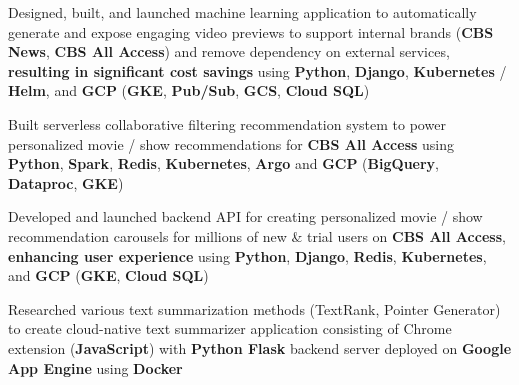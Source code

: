 \begin{cventries}
{\begin{cvitems}
            \item {Designed, built, and launched machine learning application to automatically generate and expose engaging video previews to support internal brands (\textbf{CBS News}, \textbf{CBS All Access}) and remove dependency on external services, \textbf{resulting in significant cost savings} using \textbf{Python}, \textbf{Django}, \textbf{Kubernetes} / \textbf{Helm}, and \textbf{GCP} (\textbf{GKE}, \textbf{Pub/Sub}, \textbf{GCS}, \textbf{Cloud SQL})}
 		\item {Built serverless collaborative filtering recommendation system to power personalized movie / show recommendations for \textbf{CBS All Access} using \textbf{Python}, \textbf{Spark}, \textbf{Redis}, \textbf{Kubernetes}, \textbf{Argo} and \textbf{GCP} (\textbf{BigQuery}, \textbf{Dataproc}, \textbf{GKE})}
        \item {Developed and launched backend API for creating personalized movie / show recommendation carousels for millions of new \& trial users on \textbf{CBS All Access}, \textbf{enhancing user experience} using \textbf{Python}, \textbf{Django}, \textbf{Redis}, \textbf{Kubernetes}, and \textbf{GCP} (\textbf{GKE}, \textbf{Cloud SQL})}
  		\item {Researched various text summarization methods (TextRank, Pointer Generator) to create cloud-native text summarizer application consisting of Chrome extension (\textbf{JavaScript}) with \textbf{Python Flask} backend server deployed on \textbf{Google App Engine} using \textbf{Docker}}

\end{cvitems}}
\end{cventries}
